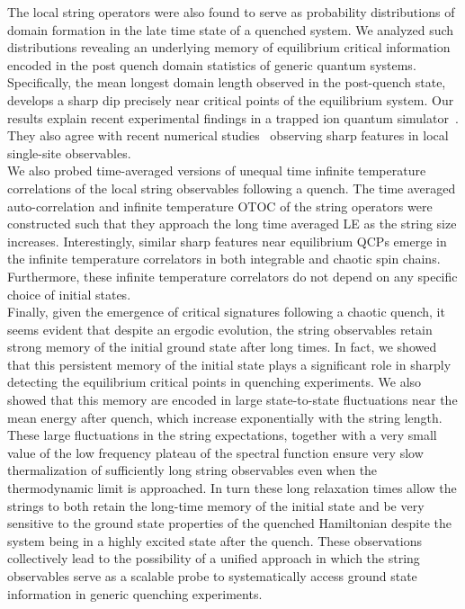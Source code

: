 \documentclass[aps,prx,twocolumn]{revtex4-2}
\begin{document}
{{The local string operators were also found to serve as probability distributions of domain formation in the late time state of a quenched system.  We analyzed such distributions revealing an underlying memory of equilibrium critical information encoded in the post quench domain statistics of generic quantum systems. Specifically, the mean longest domain length observed in the post-quench state, develops a sharp dip precisely near critical points of the equilibrium system.  Our results explain recent experimental findings in a trapped ion quantum simulator~\cite{Zhang2017}. They also agree with recent numerical studies~\cite{ettore20,halimeh21} observing sharp features in local single-site observables. \\

We also probed time-averaged versions of unequal time infinite temperature correlations of the local string observables following a quench. The time averaged auto-correlation and infinite temperature OTOC of the string operators were constructed such that they approach the long time averaged LE as the string size increases. Interestingly, similar sharp features near equilibrium QCPs emerge in the infinite temperature correlators in both integrable and chaotic spin chains. Furthermore, these infinite temperature correlators do not depend on any specific choice of initial states.\\

Finally, given the emergence of critical signatures following a chaotic quench, it seems evident that despite an ergodic evolution, the string observables retain strong memory of the initial ground state after long times. In fact, we showed that this persistent memory of the initial state plays a significant role in sharply detecting the equilibrium critical points in quenching experiments. We also showed that this memory are encoded in large state-to-state fluctuations near the mean energy after quench, which increase exponentially with the string length. These large fluctuations in the string expectations,  {together with a very small value of the low frequency plateau of the spectral function ensure very slow thermalization of sufficiently long string observables even when the thermodynamic limit is approached. In turn these long relaxation times allow the strings to both retain the long-time memory of the initial state and be very sensitive to the ground state properties of the quenched Hamiltonian despite the system being in a highly excited state after the quench.} These observations collectively lead to the possibility of a unified approach in which the string observables serve as a scalable probe to systematically access ground state information in generic quenching experiments.\\


}}
\end{document}
